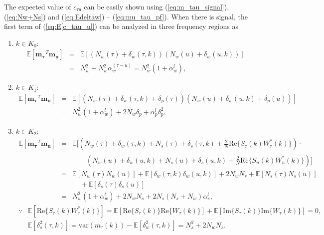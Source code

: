\documentclass[draftclsnofoot,onecolumn,12pt]{IEEEtran}
\begin{document}
The expected value of $c_{\tau u}$ can be easily shown using (\ref{eq:m_tau_signal}), (\ref{eq:Nw+Ns}) and (\ref{eq:Edeltaw}) -- (\ref{eq:mu_tau_pf}).
  When there is signal, the first term of (\ref{eq:E[c_tau_u]}) can be analyzed in three frequency regions as \begin{enumerate}
    \item $k \in K_0$: ~
      \begin{eqnarray}
	\mathbb{E}[\mathbf{m_\tau}^T \mathbf{m_u}] &=& \mathbb{E} \left[ \left( N_w(\tau) + \delta_w(\tau, k) \right)
			\left( N_w(u)+ \delta_w(u, k) \right) \right] \nonumber \\
&=& N_w^2 + N_w^2 \alpha_w^{(\tau - u)} = N_w^2 \left(1 + \alpha_w^l \right),
	\label{eq:Emt_k0}
      \end{eqnarray}

    \item $k \in K_1$:
      \begin{eqnarray}
	\mathbb{E}[\mathbf{m_\tau}^T \mathbf{m_u}] &=& \mathbb{E} \left[ \left( N_w(\tau) + \delta_w(\tau, k) + \delta_p(\tau)\right)
			\left( N_w(u)+ \delta_w(u, k) + \delta_p(u) \right) \right] \nonumber \\
&=& N_w^2 \left( 1 + \alpha_w^l \right) + 2N_w \delta_p + \alpha_p^l \delta_p^2,
	\label{eq:Emt_k1}
      \end{eqnarray}

    \item $k \in K_2$:
      \begin{eqnarray}
	\mathbb{E}[\mathbf{m_\tau}^T \mathbf{m_u}] &=& \mathbb{E} \big[ \left( N_w(\tau) + \delta_w(\tau, k) + N_s(\tau) + \delta_s(\tau,k) + \frac{2}{N}\mathrm{Re}\{S_\tau(k)W_\tau^\ast(k)\}\right) \cdot \nonumber \\
			&~& \quad \quad \left( N_w(u)+ \delta_w(u, k) + N_s(u) + \delta_s(u,k) + \frac{2}{N}\mathrm{Re}\{S_u(k)W_u^\ast(k)\} \right) \big] \nonumber \\
			&=& \mathbb{E}[N_w(\tau)N_w(u)] + \mathbb{E}[\delta_w(\tau,k) \delta_w(u,k)] + 2N_w N_s + \mathbb{E}[N_s(\tau) N_s(u)] \nonumber \\
			&~& \;\;\;\; + \mathbb{E}[\delta_s(\tau) \delta_s(u)] \label{eq:Emt_k2_1} \\
	&=& N_w^2 \left( 1 + \alpha_w^l \right) + 2N_w N_s + 2N_s(N_s + N_w)\alpha_s^l,
	\label{eq:Emt_k2}
      \end{eqnarray}
\begin{equation*}
	\begin{array}{ll}
	  \because & \mathbb{E}[\mathrm{Re}\{S_\tau(k)W_\tau^\ast (k)\}] = \mathbb{E}[\mathrm{Re}\{S_\tau(k)\} \mathrm{Re}\{W_\tau(k)\}] + \mathbb{E}[\mathrm{Im}\{S_\tau(k)\} \mathrm{Im}\{W_\tau(k)\}] = 0, \\
&  \mathbb{E}[\delta_s^2(\tau, k)] = \mathrm{var}\left( m_\tau(k) \right) - \mathbb{E}[\delta_w^2(\tau, k)] = N_s^2 + 2N_w N_s.
      \end{array}
      \end{equation*}
\end{enumerate}
\end{document}
